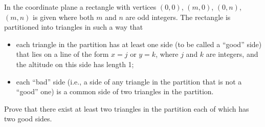 In the coordinate plane a rectangle with vertices $(0,0)$, $(m,0)$, $(0,n)$, $(m,n)$ is given where both $m$ and $n$ are odd integers. The rectangle is partitioned into triangles in such a way that
\begin{itemize}
\item[(i)] each triangle in the partition has at least one side (to be called a ``good'' side) that lies on a line of the form $x = j$ or $y = k$, where $j$ and $k$ are integers, and the altitude on this side has length 1;
\item[(ii)] each ``bad'' side (i.e., a side of any triangle in the partition that is not a ``good'' one) is a common side of two triangles in the partition.
\end{itemize}
Prove that there exist at least two triangles in the partition each of which has two good sides.

